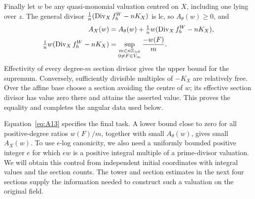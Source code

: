 Finally let \(w\) be any quasi-monomial valuation centred on \(X\),
including one lying over \(z\). The general divisor
\(\frac1n(\operatorname{Div}_X f_h^W-nK_X)\) is lc, so \(A_\theta(w)\geq0\), and
\begin{equation}
 \begin{split}
 A_X(w)&=A_\theta(w)
             +\tfrac1n w(\operatorname{Div}_X f_h^W-nK_X),\\
 \tfrac1n w(\operatorname{Div}_X f_h^W-nK_X)
       &=\sup_{\substack{m\in n\mathbb Z_{>0}\\0\ne F\in V_m}}
                                      \frac{-w(F)}m.
 \end{split}
 \label{eq:A13}
\end{equation}
Effectivity of every degree-\(m\) section divisor gives the upper bound
for the supremum. Conversely, sufficiently divisible multiples of
\(-K_X\) are relatively free. Over the affine base choose a section
avoiding the centre of \(w\); its effective section divisor has value
zero there and attains the asserted value. This proves the equality
and completes the angular data used below.

Equation~\eqref{eq:A13} specifies the final task. A lower bound close
to zero for all positive-degree ratios \(w(F)/m\), together with small
\(A_\theta(w)\), gives small \(A_X(w)\). To use \(\epsilon\)-log
canonicity, we also need a uniformly bounded positive integer \(e\) for
which \(ew\) is a positive integral multiple of a prime-divisor valuation.
We will obtain this control from independent initial coordinates with
integral values and the section counts. The tower and section estimates
in the next four sections supply the information needed to construct
such a valuation on the original field.
